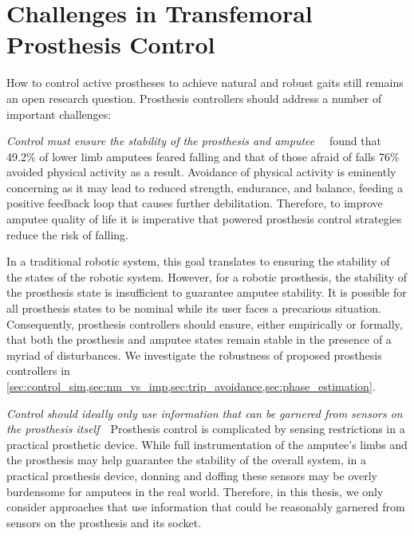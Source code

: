 \section{Challenges in Transfemoral Prosthesis
Control}\label{sec:intro_challenges} 

How to control active prostheses to achieve natural and robust gaits still
remains an open research question. Prosthesis controllers should address a
number of important challenges: 

\begin{challenges}
    \item\label{chal:robust} \emph{Control must ensure the stability of the
    prosthesis and amputee}~~\citet{miller2001prevalence} found that 49.2\% of
    lower limb amputees feared falling and that of those afraid of falls 76\%
    avoided physical activity as a result. Avoidance of physical activity is
    eminently concerning as it may lead to reduced strength, endurance, and
    balance, feeding a positive feedback loop that causes further debilitation.
    Therefore, to improve amputee quality of life it is imperative that powered
    prosthesis control strategies reduce the risk of falling. 
    
    In a traditional robotic system, this goal translates to ensuring the
    stability of the states of the robotic system. However, for a robotic
    prosthesis, the stability of the prosthesis state is insufficient to
    guarantee amputee stability. It is possible for all prosthesis states to be
    nominal while its user faces a precarious situation. Consequently,
    prosthesis controllers should ensure, either empirically or formally, that
    both the prosthesis and amputee states remain stable in the presence of a
    myriad of disturbances. We investigate the robustness of proposed prosthesis
    controllers in
    \cref{sec:control_sim,sec:nm_vs_imp,sec:trip_avoidance,sec:phase_estimation}.
    
    \item\label{chal:sensing} \emph{Control should ideally only use information
    that can be garnered from sensors on the prosthesis itself}~~Prosthesis
    control is complicated by sensing restrictions in a practical prosthetic
    device. While full instrumentation of the amputee's limbs and the prosthesis
    may help guarantee the stability of the overall system, in a practical
    prosthesis device, donning and doffing these sensors may be overly
    burdensome for amputees in the real world. Therefore, in this thesis, we
    only consider approaches that use information that could be reasonably
    garnered from sensors on the prosthesis and its socket.


\end{challenges}
